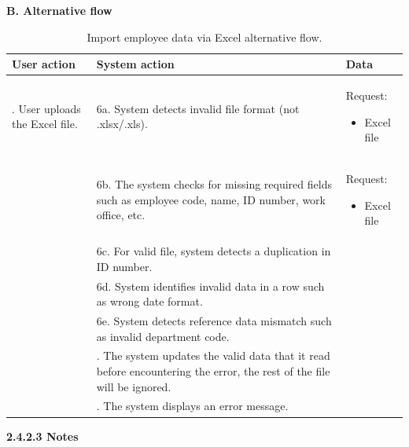 \par\indent\indent\textbf{B. Alternative flow}
\vspace{-0.5em}
\renewcommand{\arraystretch}{1.5}
\begin{longtable}{|>{\raggedright\arraybackslash}p{4.5cm}|
                  >{\raggedright\arraybackslash}p{6cm}|
                  >{\raggedright\arraybackslash}p{4.5cm}|}                  
\caption{Import employee data via Excel alternative flow.}
\label{tab:employee_management_import_data_alternative_flow} \\
\hline
\centering\textbf{User action} & \centering\textbf{System action} & \centering\arraybackslash\textbf{Data} \\
\hline
\endfirsthead
\endhead

5. User uploads the Excel file.& 6a. System detects invalid file format (not .xlsx/.xls).
&\par{Request:
    \vspace{-0.8em}
    \begin{itemize}
        \item Excel file
        \vspace{-1.4em}
    \end{itemize}
}\\

\hline
&6b. The system checks for missing required fields such as employee code, name, ID number, work office, etc.&
\par{Request:
    \vspace{-0.8em}
    \begin{itemize}
        \item Excel file
    \end{itemize}
}\\
\hline
&6c. For valid file, system detects a duplication in ID number.&\\
\hline
&6d. System identifies invalid data in a row such as wrong date format.& \\
\hline
&6e. System detects reference data mismatch such as invalid department code.&\\
\hline
&7. The system updates the valid data that it read before encountering the error, the rest of the file will be ignored. &\\
\hline
&10. The system displays an error message.&\\
\hline
\end{longtable}
\newpage
\indent\textbf{2.4.2.3 Notes}\\
\vspace{-0.7em}
